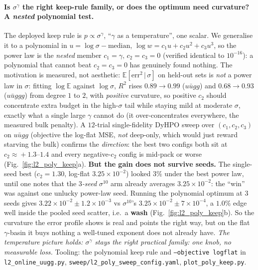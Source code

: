 \documentclass[11pt]{article}
\newcommand{\code}[1]{\texttt{#1}}
\begin{document}
\paragraph{Is $\sigma^\gamma$ the right keep-rule family, or does the optimum need curvature? A
\emph{nested} polynomial test.} The deployed keep rule is $p\!\propto\!\sigma^\gamma$, ``$\gamma$ as a
temperature'', one scalar. We generalise it to a polynomial in $u=\log\sigma-\mathrm{median}$,
$\log w = c_1 u + c_2 u^2 + c_3 u^3$, so the power law is the \emph{nested} member $c_1{=}\gamma,\,
c_2{=}c_3{=}0$ (verified identical to $10^{-16}$): a polynomial that cannot beat $c_2{=}c_3{=}0$ has
genuinely found nothing. The motivation is measured, not aesthetic: $\mathbb E[\mathrm{err}^2\,|\,\sigma]$
on held-out sets is \emph{not} a power law in $\sigma$: fitting $\log\mathbb E$ against $\log\sigma$,
$R^2$ rises $0.89\!\to\!0.99$ ($u\bar u gg$) and $0.68\!\to\!0.93$ ($u\bar u ggg$) from degree $1$ to $2$,
with \emph{positive} curvature, so positive $c_2$ should concentrate extra budget in the high-$\sigma$
tail while staying mild at moderate $\sigma$, exactly what a single large $\gamma$ cannot do (it
over-concentrates everywhere, the measured bulk penalty). A $12$-trial single-fidelity DyHPO sweep over
$(c_1,c_2,c_3)$ on $u\bar u gg$ (objective the log-flat MSE, \emph{not} deep-only, which would just reward
starving the bulk) confirms the \emph{direction}: the best two configs both sit at $c_2\!\approx\!+1.3$--$1.4$
and every negative-$c_2$ config is mid-pack or worse (Fig.~\ref{fig:l2_poly_keep}a). \textbf{But the gain
does not survive seeds.} The single-seed best ($c_2{=}1.30$, log-flat $3.25\times10^{-2}$) looked $3\%$
under the best power law, until one notes that the \emph{$3$-seed} $\sigma^{10}$ arm already averages
$3.25\times10^{-2}$: the ``win'' was against one unlucky power-law seed. Running the polynomial optimum at
$3$ seeds gives $3.22\times10^{-2}\!\pm\!1.2\times10^{-3}$ vs $\sigma^{10}$'s $3.25\times10^{-2}\!\pm\!
7\times10^{-4}$, a $1.0\%$ edge well inside the pooled seed scatter, i.e.\ a \textbf{wash}
(Fig.~\ref{fig:l2_poly_keep}b). So the curvature the error profile shows is real and points the right way,
but on the flat $\gamma$-basin it buys nothing a well-tuned exponent does not already have. \emph{The
temperature picture holds: $\sigma^\gamma$ stays the right practical family: one knob, no measurable
loss.} Tooling: the polynomial keep rule and \code{--objective logflat} in \code{l2\_online\_uugg.py},
\code{sweep/l2\_poly\_sweep\_config.yaml}, \code{plot\_poly\_keep.py}.
\end{document}
